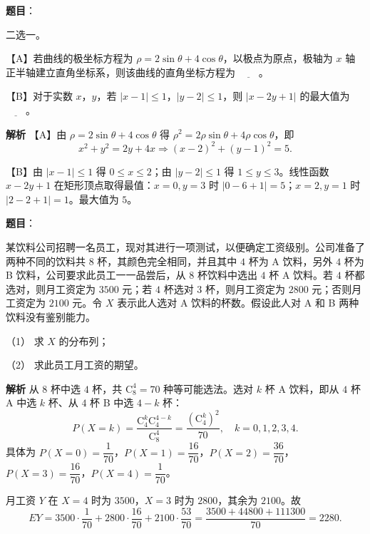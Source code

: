 \begin{answer}

\textbf{题目}：

二选一。

【A】若曲线的极坐标方程为 $\rho=2\sin\theta+4\cos\theta$，以极点为原点，极轴为 $x$ 轴正半轴建立直角坐标系，则该曲线的直角坐标方程为 $\underline{\qquad}$。

【B】对于实数 $x$，$y$，若 $|x-1|\leqslant1$，$|y-2|\leqslant1$，则 $|x-2y+1|$ 的最大值为 $\underline{\qquad}$。

\textbf{解析}
【A】由 $\rho=2\sin\theta+4\cos\theta$ 得 $\rho^2=2\rho\sin\theta+4\rho\cos\theta$，即
\nopagebreak[4]
\[x^2+y^2=2y+4x\Longrightarrow(x-2)^2+(y-1)^2=5.\]

【B】由 $|x-1|\leqslant1$ 得 $0\leqslant x\leqslant2$；由 $|y-2|\leqslant1$ 得 $1\leqslant y\leqslant3$。线性函数 $x-2y+1$ 在矩形顶点取得最值：$x=0,y=3$ 时 $|0-6+1|=5$；$x=2,y=1$ 时 $|2-2+1|=1$。最大值为 $5$。


\end{answer}
\begin{answer}

\textbf{题目}：

某饮料公司招聘一名员工，现对其进行一项测试，以便确定工资级别。公司准备了两种不同的饮料共 $8$ 杯，其颜色完全相同，并且其中 $4$ 杯为 A 饮料，另外 $4$ 杯为 B 饮料，公司要求此员工一一品尝后，从 $8$ 杯饮料中选出 $4$ 杯 A 饮料。若 $4$ 杯都选对，则月工资定为 $3500$ 元；若 $4$ 杯选对 $3$ 杯，则月工资定为 $2800$ 元；否则月工资定为 $2100$ 元。令 $X$ 表示此人选对 A 饮料的杯数。假设此人对 A 和 B 两种饮料没有鉴别能力。

（1） 求 $X$ 的分布列；

（2） 求此员工月工资的期望。

\textbf{解析}
从 $8$ 杯中选 $4$ 杯，共 $\mathrm C_8^4=70$ 种等可能选法。选对 $k$ 杯 A 饮料，即从 $4$ 杯 A 中选 $k$ 杯、从 $4$ 杯 B 中选 $4-k$ 杯：
\nopagebreak[4]
\[P(X=k)=\frac{\mathrm C_4^k\mathrm C_4^{4-k}}{\mathrm C_8^4}=\frac{(\mathrm C_4^k)^2}{70},\quad k=0,1,2,3,4.\]
具体为 $P(X=0)=\dfrac1{70}$，$P(X=1)=\dfrac{16}{70}$，$P(X=2)=\dfrac{36}{70}$，$P(X=3)=\dfrac{16}{70}$，$P(X=4)=\dfrac1{70}$。

月工资 $Y$ 在 $X=4$ 时为 $3500$，$X=3$ 时为 $2800$，其余为 $2100$。故
\nopagebreak[4]
\[EY=3500\cdot\frac1{70}+2800\cdot\frac{16}{70}+2100\cdot\frac{53}{70}
=\frac{3500+44800+111300}{70}=2280.\]



\end{answer}
